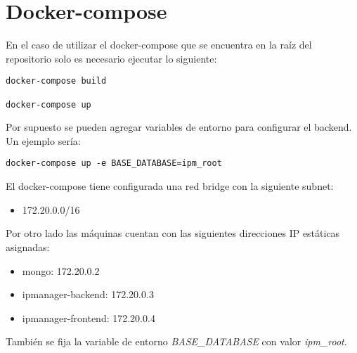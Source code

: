 \section{Docker-compose}

En el caso de utilizar el docker-compose que se encuentra en la raíz del repositorio solo es necesario ejecutar lo siguiente:

\begin{lstlisting}
docker-compose build

docker-compose up
\end{lstlisting}

Por supuesto se pueden agregar variables de entorno para configurar el backend. Un ejemplo sería:

\begin{lstlisting}
docker-compose up -e BASE_DATABASE=ipm_root
\end{lstlisting}

El docker-compose tiene configurada una red bridge con la siguiente subnet:

\begin{itemize}
	\item 172.20.0.0/16
\end{itemize}

Por otro lado las máquinas cuentan con las siguientes direcciones IP estáticas asignadas:

\begin{itemize}
	\item mongo: 172.20.0.2
	\item ipmanager-backend: 172.20.0.3
	\item ipmanager-frontend: 172.20.0.4
\end{itemize}

También se fija la variable de entorno \textit{BASE\_DATABASE} con valor \textit{ipm\_root}.